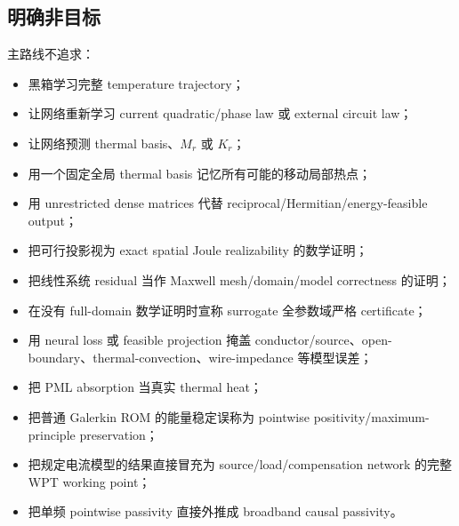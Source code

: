 \subsection{明确非目标}
主路线不追求：
\begin{itemize}
  \item 黑箱学习完整 temperature trajectory；
  \item 让网络重新学习 current quadratic/phase law 或 external circuit law；
  \item 让网络预测 thermal basis、$M_r$ 或 $K_r$；
  \item 用一个固定全局 thermal basis 记忆所有可能的移动局部热点；
  \item 用 unrestricted dense matrices 代替 reciprocal/Hermitian/energy-feasible output；
  \item 把可行投影视为 exact spatial Joule realizability 的数学证明；
  \item 把线性系统 residual 当作 Maxwell mesh/domain/model correctness 的证明；
  \item 在没有 full-domain 数学证明时宣称 surrogate 全参数域严格 certificate；
  \item 用 neural loss 或 feasible projection 掩盖 conductor/source、open-boundary、thermal-convection、wire-impedance 等模型误差；
  \item 把 PML absorption 当真实 thermal heat；
  \item 把普通 Galerkin ROM 的能量稳定误称为 pointwise positivity/maximum-principle preservation；
  \item 把规定电流模型的结果直接冒充为 source/load/compensation network 的完整 WPT working point；
  \item 把单频 pointwise passivity 直接外推成 broadband causal passivity。
\end{itemize}

